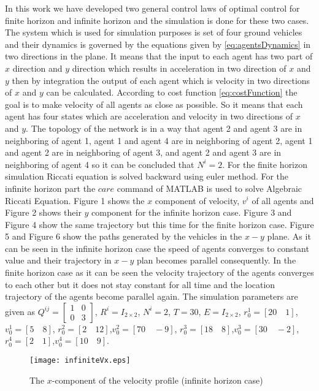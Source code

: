 \documentclass[conference]{IEEEtran}
\begin{document}
In this work we have developed two general control laws of optimal control for finite horizon and infinite horizon and the simulation is done for these two cases. The system which is used for simulation purposes is set of four ground vehicles and their dynamics is governed by the equations given by \ref{eq:agentsDynamics} in two directions in the plane. It means that the input to each agent has two part of $x$ direction and $y$ direction which results in acceleration in two direction of $x$ and $y$ then by integration the output of each agent which is velocity in two directions of $x$ and $y$ can be calculated. According to cost function \ref{eq:costFunction} the goal is to make velocity of all agents as close as possible. So it means that each agent has four states which are acceleration and velocity in two directions of $x$ and $y$. The topology of the network is in a way that agent 2 and agent 3 are in neighboring of agent 1, agent 1 and agent 4 are in neighboring of agent 2, agent 1 and agent 2 are in neighboring of agent 3, and agent 2 and agent 3 are in neighboring of agent 4 so it can be concluded that $N^{i}=2$. For the finite horizon simulation Riccati equation is solved backward using euler method. For the infinite horizon part the $care$ command of MATLAB is used to solve Algebraic Riccati Equation. Figure 1 shows the $x$ component of velocity, $v^{i}$ of all agents and Figure 2 shows their $y$ component for the infinite horizon case. Figure 3 and Figure 4 show the same trajectory but this time for the finite horizon case. Figure 5 and Figure 6 show the paths generated by the vehicles in the $x-y$ plane. As it can be seen in the infinite horizon case the speed of agents converges to constant value and their trajectory in $x-y$ plan becomes parallel consequently. In the finite horizon case as it can be seen the velocity trajectory of the agents converges to each other but it does not stay constant for all time and the location trajectory of the agents become parallel again. The simulation parameters are given as
$Q^{ij}=
\begin{bmatrix}
1 & 0 \\
0 & 3
\end{bmatrix}$, $R^{i}=I_{2 \times 2}$, $N^{i}=2$, $T=30$, $E=I_{2 \times 2}$, $r^{1}_{0}=[20 \quad 1]$,$v^{1}_{0}=[5 \quad 8]$, $r^{2}_{0}=[2 \quad 12]$,$v^{2}_{0}=[70 \quad -9]$, $r^{3}_{0}=[18 \quad 8]$,$v^{3}_{0}=[30 \quad -2]$, $r^{4}_{0}=[2 \quad 1]$,$v^{4}_{0}=[10 \quad 9]$.

\begin{figure}[h!]
    \centering\vspace{0.0cm}
    \texttt{[image: infiniteVx.eps]}\vspace{0.0cm}
	\caption{The $x$-component of the velocity profile (infinite horizon case)}\vspace{0.0cm}
	\label{myfig:1}
\end{figure}
\end{document}

